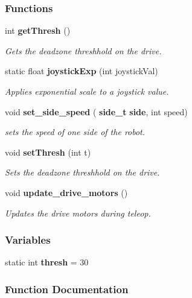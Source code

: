 \subsubsection*{Functions}
\begin{DoxyCompactItemize}
\item 
int \textbf{ get\+Thresh} ()
\begin{DoxyCompactList}\small\item\em Gets the deadzone threshhold on the drive. \end{DoxyCompactList}\item 
static float \textbf{ joystick\+Exp} (int joystick\+Val)
\begin{DoxyCompactList}\small\item\em Applies exponential scale to a joystick value. \end{DoxyCompactList}\item 
void \textbf{ set\+\_\+side\+\_\+speed} (\textbf{ side\+\_\+t} \textbf{ side}, int speed)
\begin{DoxyCompactList}\small\item\em sets the speed of one side of the robot. \end{DoxyCompactList}\item 
void \textbf{ set\+Thresh} (int t)
\begin{DoxyCompactList}\small\item\em Sets the deadzone threshhold on the drive. \end{DoxyCompactList}\item 
void \textbf{ update\+\_\+drive\+\_\+motors} ()
\begin{DoxyCompactList}\small\item\em Updates the drive motors during teleop. \end{DoxyCompactList}\end{DoxyCompactItemize}
\subsubsection*{Variables}
\begin{DoxyCompactItemize}
\item 
static int \textbf{ thresh} = 30
\end{DoxyCompactItemize}


\subsubsection{Function Documentation}
\mbox{\label{drive_8c_a9caa5e772598f9182c9ec84cf8c351ee}} 
